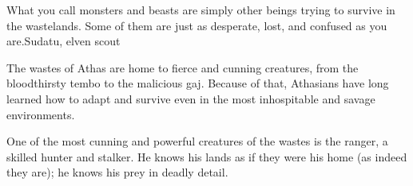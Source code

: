 {What you call monsters and beasts are simply other beings trying to survive in the wastelands. Some of them are just as desperate, lost, and confused as you are.}{Sudatu, elven scout}

The wastes of Athas are home to fierce and cunning creatures, from the bloodthirsty tembo to the malicious gaj. Because of that, Athasians have long learned how to adapt and survive even in the most inhospitable and savage environments.

One of the most cunning and powerful creatures of the wastes is the ranger, a skilled hunter and stalker. He knows his lands as if they were his home (as indeed they are); he knows his prey in deadly detail.

